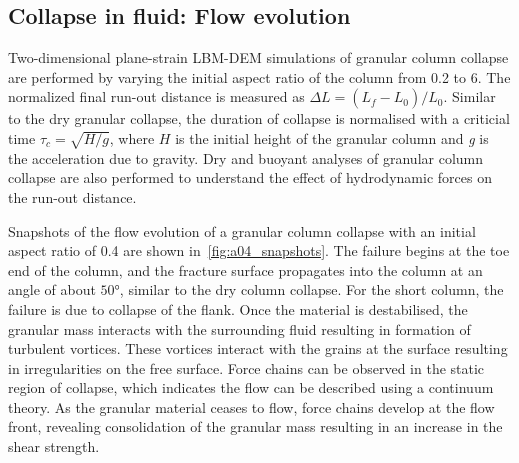\subsection{Collapse in fluid: Flow evolution}
\label{sec:collapse_fluid_evolution}
Two-dimensional plane-strain LBM-DEM simulations of granular column 
collapse are performed by varying the initial aspect ratio of the column from 
0.2 to 6. The normalized final run-out distance is measured as $\Delta L = 
(L_{\textit{f}}-L_{\textit{0}})/L_{\textit{0}}$. Similar to the dry granular 
collapse, the duration of collapse is normalised with a criticial time $\tau_c 
= \sqrt{H/g}$, where $H$ is the initial height of the granular column and 
\textit{g} is 
the acceleration due to gravity.  Dry and buoyant analyses of granular column 
collapse are also performed to understand the effect of hydrodynamic forces on 
the run-out distance.

Snapshots of the flow evolution of a granular column collapse with an initial 
aspect ratio of 0.4 are shown in~\cref{fig:a04_snapshots}. The failure begins 
at the toe end of the column, and the fracture surface propagates into the 
column at an angle of about $50\si{\degree}$, similar to the dry column 
collapse. For the 
short column, the failure is due to collapse of the flank. Once the material 
is destabilised, the granular mass interacts with the surrounding fluid 
resulting in formation of turbulent vortices. These vortices interact with the 
grains at the surface resulting in irregularities on the free surface. Force 
chains can be observed in the static region of collapse, which indicates the 
flow can be described using a continuum theory. As the granular material ceases 
to flow, 
force chains develop at the flow front, revealing consolidation of the granular 
mass resulting in an increase in the shear strength. 

